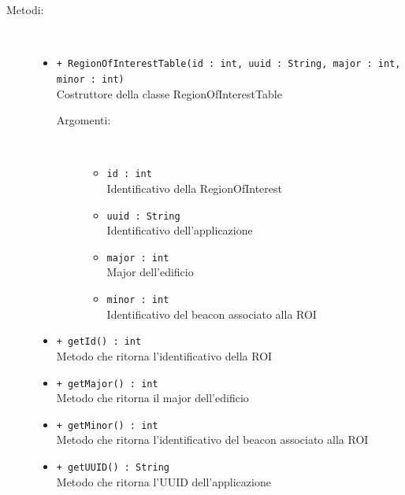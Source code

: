 \documentclass[../DefinizioneDiProdotto.tex]{subfiles}
\begin{document}
\begin{description}
\begin{itemize}
	\end{itemize}
	\item[Metodi:] \
	\begin{itemize}
		\item \texttt{+ RegionOfInterestTable(id : int, uuid : String, major : int, minor : int)}\\
		Costruttore della classe RegionOfInterestTable
		\begin{description}
			\item[Argomenti:] \
			\begin{itemize}
				\item \texttt{id : int}\\
				Identificativo della RegionOfInterest\item \texttt{uuid : String}\\
				Identificativo dell'applicazione\item \texttt{major : int}\\
				Major dell'edificio\item \texttt{minor : int}\\
				Identificativo del beacon associato alla ROI\end{itemize}
		\end{description}
		\item \texttt{+ getId() : int}\\
		Metodo che ritorna l'identificativo della ROI
		\item \texttt{+ getMajor() : int}\\
		Metodo che ritorna il major dell'edificio
		\item \texttt{+ getMinor() : int}\\
		Metodo che ritorna l'identificativo del beacon associato alla ROI
		\item \texttt{+ getUUID() : String}\\
		Metodo che ritorna l'UUID dell'applicazione
	\end{itemize}
\end{description}
\end{document}
